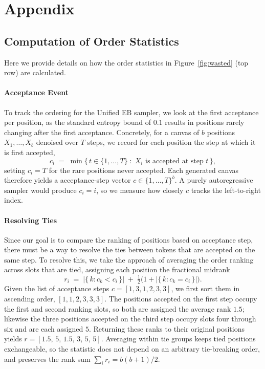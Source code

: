 \section{Appendix}

\subsection{Computation of Order Statistics}
\label{app:order-stats}
Here we provide details on how the order statistics in Figure~\ref{fig:wasted} (top row) are calculated. 

\paragraph{Acceptance Event}
To track the ordering for the Unified EB sampler, we look at the first
acceptance per position, as the standard entropy bound of $0.1$ results in
positions rarely changing after the first acceptance. Concretely, for a
canvas of $b$ positions $X_1,\dots,X_b$ denoised over $T$ steps, we record
for each position the step at which it is first accepted,
\begin{equation}
  c_i \;=\; \min\bigl\{\, t \in \{1,\dots,T\} \;:\; X_i \text{ is accepted at step } t \,\bigr\},
\end{equation}
setting $c_i = T$ for the rare positions never accepted. Each generated
canvas therefore yields a acceptance-step vector $c \in \{1,\dots,T\}^{b}$. A
purely autoregressive sampler would produce $c_i = i$, so we measure how
closely $c$ tracks the left-to-right index.

\paragraph{Resolving Ties}
Since our goal is to compare the ranking of positions based on acceptance
step, there must be a way to resolve the ties between tokens that are
accepted on the same step. To resolve this, we take the approach of
averaging the order ranking across slots that are tied, assigning each
position the fractional midrank
\begin{equation}
  r_i \;=\; \bigl|\{\,k : c_k < c_i\,\}\bigr|
        \;+\; \tfrac{1}{2}\bigl(1 + \bigl|\{\,k : c_k = c_i\,\}\bigr|\bigr).
\end{equation}
Given the list of acceptance steps $c = [1, 3, 1, 2, 3, 3]$, we first sort them
in ascending order, $[1, 1, 2, 3, 3, 3]$. The positions accepted on the
first step occupy the first and second ranking slots, so both are assigned
the average rank $1.5$; likewise the three positions accepted on the third
step occupy slots four through six and are each assigned $5$. Returning
these ranks to their original positions yields
$r = [1.5,\, 5,\, 1.5,\, 3,\, 5,\, 5]$. Averaging within tie groups keeps
tied positions exchangeable, so the statistic does not depend on an
arbitrary tie-breaking order, and preserves the rank sum
$\sum_i r_i = b(b+1)/2$.

